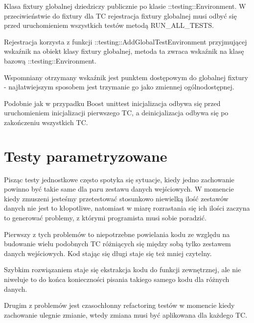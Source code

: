 \documentclass[12pt,a4paper,notitlepage]{report}
\begin{document}
Klasa fixtury globalnej dziedziczy publicznie po klasie ::testing::Environment. W przeciwieństwie do fixtury dla TC rejestracja fixtury globalnej musi odbyć się przed uruchomieniem wszystkich testów metodą RUN{\_}ALL{\_}TESTS.

Rejestracja korzysta z funkcji ::testing::AddGlobalTestEnvironment przyjmującej wskaźnik na obiekt klasy fixtury globalnej, metoda ta zwraca wskaźnik na klasę bazową ::testing::Environment. 

Wspomniany otrzymany wskaźnik jest punktem dostępowym do globalnej fixtury - najłatwiejszym sposobem jest trzymanie go jako zmiennej ogólnodostępnej.

Podobnie jak w przypadku Boost unittest inicjalizacja odbywa się przed uruchomieniem inicjalizacji pierwszego TC, a deinicjalizacja odbywa się po zakończeniu wszystkich TC.

			

\chapter{Testy parametryzowane}

Pisząc testy jednostkowe często spotyka się sytuacje, kiedy jedno zachowanie powinno być takie same dla paru zestawu danych wejściowych. W momencie kiedy zmuszeni jesteśmy przetestować stosunkowo niewielką ilość zestawów danych nie jest to kłopotliwe, natomiast w miarę rozrastania się ich ilości zaczyna to generować problemy, z którymi programista musi sobie poradzić.

Pierwszy z tych problemów to niepotrzebne powielania kodu ze względu na budowanie wielu podobnych TC różniących się między sobą tylko zestawem danych wejściowych. Kod stając się długi staje się też mniej czytelny.

Szybkim rozwiązaniem staje się ekstrakcja kodu do funkcji zewnętrznej, ale nie niweluje to do końca konieczności pisania takiego samego kodu dla różnych danych.

Drugim z problemów jest czasochłonny refactoring testów w momencie kiedy zachowanie ulegnie zmianie, wtedy zmiana musi być aplikowana dla każdego TC.
\end{document}

